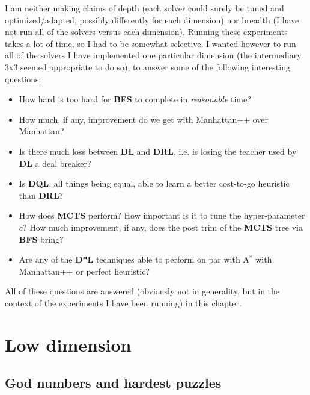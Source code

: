 I am neither making claims of depth (each solver could surely be tuned and optimized/adapted, possibly differently for each dimension) nor breadth (I have not run all of the solvers versus each dimension). Running these experiments takes a lot of time, so I had to be somewhat selective. I wanted however to run all of the solvers I have implemented one particular dimension (the intermediary 3x3 seemed appropriate to do so), to answer some of the following interesting questions:
\begin{itemize}
\item How hard is too hard for \textbf{BFS} to complete in \textit{reasonable} time?
\item How much, if any, improvement do we get with Manhattan++ over Manhattan?
\item Is there much loss between \textbf{DL} and \textbf{DRL}, i.e. is losing the teacher used by \textbf{DL} a deal breaker?
\item Is \textbf{DQL}, all things being equal, able to learn a better cost-to-go heuristic than \textbf{DRL}?
\item How does \textbf{MCTS} perform? How important is it to tune the hyper-parameter $c$? How much improvement, if any, does the post trim of the \textbf{MCTS} tree via \textbf{BFS} bring?
\item Are any of the \textbf{D*L} techniques able to perform on par with A$^{*}$ with Manhattan++ or perfect heuristic?
\end{itemize}
All of these questions are answered (obviously not in generality, but in the context of the experiments I have been running) in this chapter.












\section{Low dimension}
\label{sec:SPLowDimension}

\subsection{God numbers and hardest puzzles}

